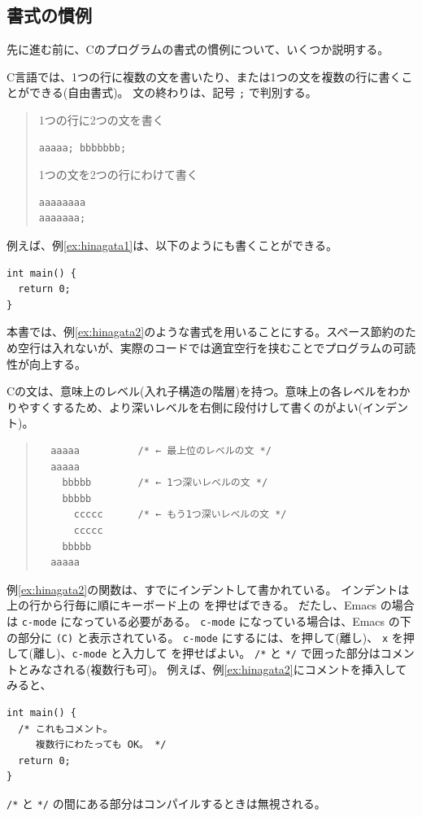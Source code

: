 \subsection{書式の慣例}

先に進む前に、Cのプログラムの書式の慣例について、いくつか説明する。

C言語では、1つの行に複数の文を書いたり、または1つの文を複数の行に書くことができる(自由書式)。
文の終わりは、記号 \verb+;+ で判別する。
\begin{quote}
  1つの行に2つの文を書く
\begin{verbatim}
aaaaa; bbbbbbb;
\end{verbatim}
  1つの文を2つの行にわけて書く
\begin{verbatim}
aaaaaaaa
aaaaaaa;
\end{verbatim}
\end{quote}
例えば、例\ref{ex:hinagata1}は、以下のようにも書くことができる。
\begin{reidai}\label{ex:hinagata2}
\begin{verbatim}
int main() {
  return 0;
}
\end{verbatim}
\end{reidai} \noindent
本書では、例\ref{ex:hinagata2}のような書式を用いることにする。スペース節約のため空行は入れないが、実際のコードでは適宜空行を挟むことでプログラムの可読性が向上する。

Cの文は、意味上のレベル(入れ子構造の階層)を持つ。意味上の各レベルをわかりやすくするため、より深いレベルを右側に段付けして書くのがよい(インデント)。
\begin{quote}
\begin{verbatim}
  aaaaa          /* ← 最上位のレベルの文 */
  aaaaa
    bbbbb        /* ← 1つ深いレベルの文 */
    bbbbb
      ccccc      /* ← もう1つ深いレベルの文 */
      ccccc
    bbbbb
  aaaaa
\end{verbatim}
\end{quote}
例\ref{ex:hinagata2}の関数は、すでにインデントして書かれている。
インデントは上の行から行毎に順にキーボード上の \tabkey を押せばできる。
だたし、Emacs の場合は \verb+c-mode+ になっている必要がある。
\verb+c-mode+ になっている場合は、Emacs の下の部分に \verb+(C)+ と表示されている。
\verb+c-mode+ にするには、\esckey を押して(離し)、
\verb+x+ を押して(離し)、\verb+c-mode+ と入力して \ret を押せばよい。
\verb+/*+ と \verb+*/+ で囲った部分はコメントとみなされる(複数行も可)。
例えば、例\ref{ex:hinagata2}にコメントを挿入してみると、
\begin{reidai}
\begin{verbatim}
int main() {
  /* これもコメント。
     複数行にわたっても OK。 */
  return 0;
}
\end{verbatim}
\end{reidai} \noindent
\verb+/*+ と \verb+*/+ の間にある部分はコンパイルするときは無視される。

